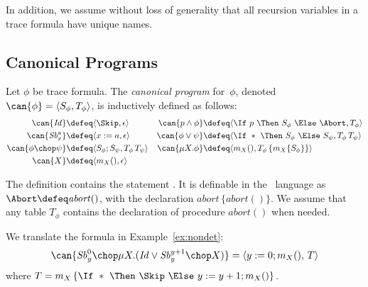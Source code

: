 \documentclass[a4paper,numberwithinsect]{lipics-v2021}
\begin{document}

In addition, we assume without loss of generality that all recursion
variables in a trace formula have unique names.


\subsection{Canonical Programs}
\label{sec:canonical-programs-1}

\begin{definition}
\label{def:can}
  Let $\phi$ be trace formula. The \emph{canonical program}
  for~$\phi$, denoted $\can{\phi}=\langle S_\phi,T_\phi\rangle$, is
  inductively defined as follows:
  \begin{align*}
    \can{\mathit{Id}} & \defeq \langle\Skip,\epsilon\rangle &
    \can{p\wedge\phi} & \defeq \langle\If\ p\ \Then\ S_\phi\ \Else\ \Abort,T_\phi\rangle \\
    \can{\mathit{Sb}^a_x} & \defeq \langle x:=a,\epsilon\rangle &
    \can{\phi\vee\psi} & \defeq \langle\If\ \ast\ \Then\ S_\phi\ \Else\ S_\psi,T_\phi\, T_\psi\rangle\\
    \can{\phi\chop\psi} & \defeq \langle S_\phi;S_\psi,T_\phi\, T_\psi\rangle &
    \can{\mu X.\phi} & \defeq \langle m_X(),T_\phi\,\{m_X \{S_\phi\}\}\rangle\\
    \can{X} & \defeq \langle m_X(),\epsilon\rangle
  \end{align*}
\end{definition}

The definition contains the statement
\Abort. %
It is definable in the \Rec\ language as
%
$\Abort \defeq \mathit{abort()}$, with the declaration
$\mathit{abort}\,\{\mathit{abort()}\}$.
%
We assume that any table $T_\phi$ contains the declaration of procedure
$\mathit{abort}()$ when needed.

\begin{example}
We translate the formula in Example~\ref{ex:nondet}: 
%
$$ \can{\mathit{Sb}_y^0\chop\mu X.(\mathit{Id}\lor\mathit{Sb}_y^{y+1}\chop X)} =
   \langle y:=0;m_X(),\,T\rangle $$
%
where $T=m_X\,\{\If\ \ast\ \Then\ \Skip\ \Else\ y:=y+1;m_X()\}$.
\end{example}
\end{document}
